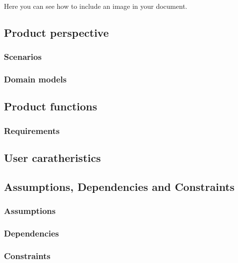 Here you can see how to include an image in your document.

%

%

\subsection{Product perspective}

\subsubsection{Scenarios}

\subsubsection{Domain models}


\subsection{Product functions}

\subsubsection{Requirements}

\subsection{User caratheristics}

\subsection{Assumptions, Dependencies and Constraints}

\subsubsection{Assumptions}

\subsubsection{Dependencies}

\subsubsection{Constraints}